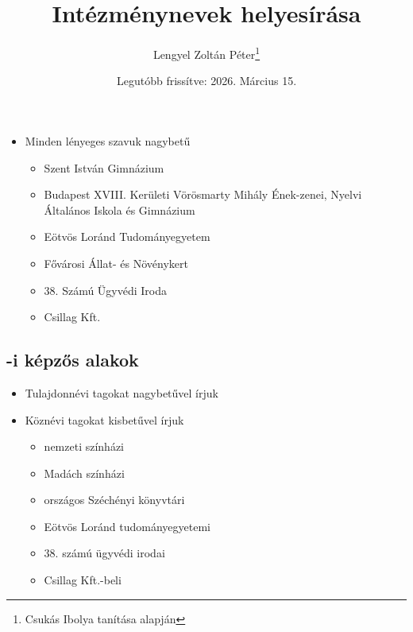 \documentclass{article}
\title{Intézménynevek helyesírása}
\author{Lengyel Zoltán Péter\thanks{Csukás Ibolya tanítása alapján}}
\date{Legutóbb frissítve: 2026. Március 15.}
\begin{document}
\maketitle
\tableofcontents
\newpage

\begin{itemize}
    \item Minden lényeges szavuk nagybetű
    \begin{itemize}
        \item Szent István Gimnázium
        \item Budapest XVIII. Kerületi Vörösmarty Mihály Ének-zenei, Nyelvi Általános Iskola és Gimnázium
        \item Eötvös Loránd Tudományegyetem
        \item Fővárosi Állat- és Növénykert
        \item 38. Számú Ügyvédi Iroda
        \item Csillag Kft.
    \end{itemize}
\end{itemize}
\subsection{-i képzős alakok}
\begin{itemize}
    \item Tulajdonnévi tagokat nagybetűvel írjuk
    \item Köznévi tagokat kisbetűvel írjuk
    \begin{itemize}
        \item nemzeti színházi
        \item Madách színházi
        \item országos Széchényi könyvtári
        \item Eötvös Loránd tudományegyetemi
        \item 38. számú ügyvédi irodai
        \item Csillag Kft.-beli
    \end{itemize}
\end{itemize}
\end{document}
